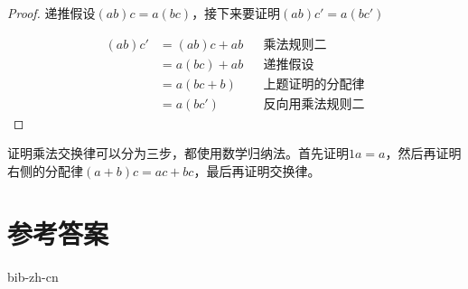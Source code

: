 \documentclass[b5paper]{ctexart}
\begin{document}
\begin{Answer}[ref={ex:zero}]
{\begin{proof}
递推假设$(ab)c = a(bc)$，接下来要证明$(ab)c' = a(bc')$

\begin{align*}
(ab)c' & = (ab)c + ab && \text{乘法规则二} \\
       & = a(bc) + ab && \text{递推假设} \\
       & = a(bc + b) && \text{上题证明的分配律} \\
       & = a(bc') && \text{反向用乘法规则二}
\end{align*}
\end{proof}

证明乘法交换律可以分为三步，都使用数学归纳法。首先证明$1a = a$，然后再证明右侧的分配律$(a + b)c = ac + bc$，最后再证明交换律。
}

\end{Answer}

\ifx\wholebook\relax \else
\section{参考答案}
\shipoutAnswer

\begin{thebibliography}{99}
{bib-zh-cn}
\end{thebibliography}

\expandafter\enddocument
\fi
\end{document}

